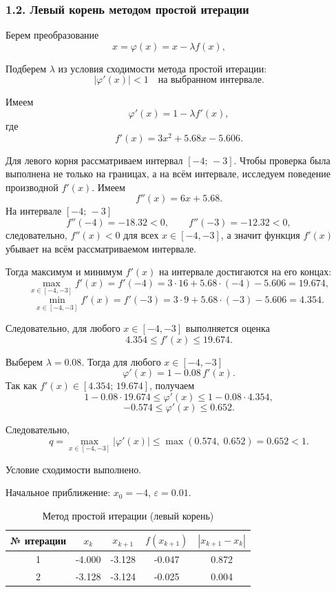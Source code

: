 ﻿\documentclass[12pt,a4paper]{article}
\begin{document}
\subsubsection*{1.2. Левый корень методом простой итерации}
Берем преобразование
\[
x=\varphi(x)=x-\lambda f(x),\qquad
\]

Подберем \(\lambda\) из условия сходимости метода простой итерации:
\[
|\varphi'(x)|<1 \quad \text{на выбранном интервале}.
\]

Имеем
\[
\varphi'(x)=1-\lambda f'(x),
\]
где
\[
f'(x)=3x^2+5.68x-5.606.
\]

Для левого корня рассматриваем интервал \([-4;\,-3]\). Чтобы проверка была
выполнена не только на границах, а на всём интервале, исследуем поведение
производной \(f'(x)\). Имеем
\[
f''(x)=6x+5.68.
\]
На интервале \([-4;\,-3]\)
\[
f''(-4)=-18.32<0,\qquad f''(-3)=-12.32<0,
\]
следовательно, \(f''(x)<0\) для всех \(x\in[-4,-3]\), а значит функция
\(f'(x)\) убывает на всём рассматриваемом интервале.

Тогда максимум и минимум \(f'(x)\) на интервале достигаются на его концах:
\[
\max_{x\in[-4,-3]} f'(x)=f'(-4)=3\cdot 16+5.68\cdot(-4)-5.606=19.674,
\]
\[
\min_{x\in[-4,-3]} f'(x)=f'(-3)=3\cdot 9+5.68\cdot(-3)-5.606=4.354.
\]

Следовательно, для любого \(x\in[-4,-3]\) выполняется оценка
\[
4.354\le f'(x)\le 19.674.
\]

Выберем \(\lambda=0.08\). Тогда для любого \(x\in[-4,-3]\)
\[
\varphi'(x)=1-0.08\,f'(x).
\]
Так как \(f'(x)\in[4.354;\,19.674]\), получаем
\[
1-0.08\cdot 19.674 \le \varphi'(x) \le 1-0.08\cdot 4.354,
\]
\[
-0.574 \le \varphi'(x) \le 0.652.
\]

Следовательно,
\[
q=\max_{x\in[-4,-3]}|\varphi'(x)|
\le \max(0.574,\;0.652)=0.652<1.
\]



Условие сходимости выполнено.

Начальное приближение: $x_0=-4$, $\varepsilon=0.01$.

\begin{table}[H]
\centering
\caption{Метод простой итерации (левый корень)}
\begin{tabular}{|c|c|c|c|c|}
\hline
№ итерации & $x_k$ & $x_{k+1}$ & $f(x_{k+1})$ & $|x_{k+1}-x_k|$ \\
\hline
1 & -4.000 & -3.128 & -0.047 & 0.872 \\
\hline
2 & -3.128 & -3.124 & -0.025 & 0.004 \\
\hline
\end{tabular}
\end{table}
\end{document}
